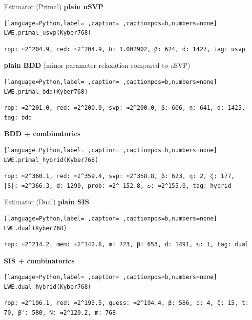 \documentclass[table,10pt,aspectratio=169]{beamer}
\begin{document}
\begin{frame}[label={sec:orgea095b6},fragile]{Estimator (Primal)}
 \textbf{plain uSVP}

\begin{lstlisting}[language=Python,label= ,caption= ,captionpos=b,numbers=none]
LWE.primal_usvp(Kyber768)
\end{lstlisting}

\begin{verbatim}
rop: ≈2^204.9, red: ≈2^204.9, δ: 1.002902, β: 624, d: 1427, tag: usvp
\end{verbatim}


\textbf{plain BDD} (minor parameter relaxation compared to uSVP)

\begin{lstlisting}[language=Python,label= ,caption= ,captionpos=b,numbers=none]
LWE.primal_bdd(Kyber768)
\end{lstlisting}

\begin{verbatim}
rop: ≈2^201.0, red: ≈2^200.0, svp: ≈2^200.0, β: 606, η: 641, d: 1425, tag: bdd
\end{verbatim}


\textbf{BDD + combinatorics}

\begin{lstlisting}[language=Python,label= ,caption= ,captionpos=b,numbers=none]
LWE.primal_hybrid(Kyber768)
\end{lstlisting}

\begin{verbatim}
rop: ≈2^360.1, red: ≈2^359.4, svp: ≈2^358.8, β: 623, η: 2, ζ: 177, |S|: ≈2^366.3, d: 1290, prob: ≈2^-152.8, ↻: ≈2^155.0, tag: hybrid
\end{verbatim}
\end{frame}

\begin{frame}[label={sec:orgab52aac},fragile]{Estimator (Dual)}
 \textbf{plain SIS}

\begin{lstlisting}[language=Python,label= ,caption= ,captionpos=b,numbers=none]
LWE.dual(Kyber768)
\end{lstlisting}

\begin{verbatim}
rop: ≈2^214.2, mem: ≈2^142.8, m: 723, β: 653, d: 1491, ↻: 1, tag: dual
\end{verbatim}


\textbf{SIS + combinatorics}

\begin{lstlisting}[language=Python,label= ,caption= ,captionpos=b,numbers=none]
LWE.dual_hybrid(Kyber768)
\end{lstlisting}

\begin{verbatim}
rop: ≈2^196.1, red: ≈2^195.5, guess: ≈2^194.4, β: 586, p: 4, ζ: 15, t: 70, β': 580, N: ≈2^120.2, m: 768
\end{verbatim}
\end{frame}
\end{document}

